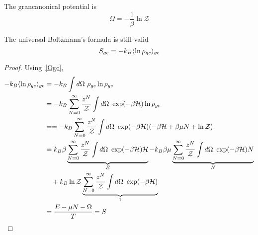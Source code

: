     The grancanonical potential is 
    \begin{equation}\label{Ogc}
        \Omega = - \frac{1}{\beta} \ln \mathcal Z
    \end{equation}

    The universal Boltzmann's formula is still valid
    \begin{equation*}
        S_{gc} = -k_B \langle\ln \rho_{gc}\rangle_{gc} 
    \end{equation*}

    \begin{proof}
        Using~\eqref{Ogc},
        \begin{equation*}
        \begin{aligned}
            -k_B \langle\ln \rho_{gc}\rangle_{gc} & = -k_B \int d\Omega ~ \rho_{gc} \ln \rho_{gc} \\ & = -k_B \sum_{N=0}^{\infty} \frac{z^N}{\mathcal Z} \int d\Omega ~ \exp(- \beta \mathcal H) \ln \rho_{gc} \\ & = = -k_B \sum_{N=0}^{\infty} \frac{z^N}{\mathcal Z} \int d\Omega ~ \exp(- \beta \mathcal H) (- \beta \mathcal H + \beta \mu N + \ln \mathcal Z) \\ & = k_B \beta \underbrace{\sum_{N=0}^{\infty} \frac{z^N}{\mathcal Z} \int d\Omega ~ \exp(-\beta \mathcal H) \mathcal H}_{E} - k_B \beta \mu \underbrace{\sum_{N=0}^{\infty} \frac{z^N}{\mathcal Z} \int d\Omega ~ \exp(-\beta \mathcal H) N}_{N} \\ & \quad + k_B \ln \mathcal Z \underbrace{\sum_{N=0}^{\infty} \frac{z^N}{\mathcal Z} \int d\Omega ~ \exp(-\beta \mathcal H)}_{1} \\ & = \frac{E - \mu N - \Omega}{T} = S
        \end{aligned}
        \end{equation*}
    \end{proof}
